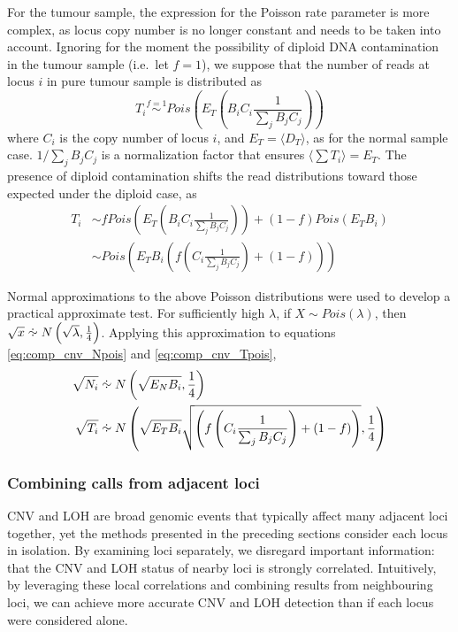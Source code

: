 \documentclass[thesis.tex]{subfiles}
\begin{document}
For the tumour sample, the expression for the Poisson rate parameter is more complex, as locus copy number is no longer constant and needs to be taken into account.  Ignoring for the moment the possibility of diploid DNA contamination in the tumour sample (i.e.\ let $f = 1$), we suppose that the number of reads at locus $i$ in pure tumour sample is distributed as
\begin{equation}
  T_i \overset{f = 1}{\sim} Pois\left(E_T \left( B_i C_i \frac{1}{\sum_{j} B_j C_j} \right) \right)
\end{equation}
where $C_i$ is the copy number of locus $i$, and $E_T = \langle D_T \rangle$, as for the normal sample case.  $1/\sum_{j} B_j C_j$ is a normalization factor that ensures $\langle \sum T_i \rangle = E_T$.  The presence of diploid contamination shifts the read distributions toward those expected under the diploid case, as
\begin{align}
  T_i &\sim f Pois\left(E_T \left( B_i C_i \frac{1}{\sum_{j} B_j C_j} \right) \right) + (1-f) Pois\left(E_T B_i\right) \\
      &\sim Pois\left(E_T B_i \left( f \left( C_i \frac{1}{\sum_{j} B_j C_j} \right) + \left(1-f\right) \right) \right) \label{eq:comp_cnv_Tpois}
\end{align}

Normal approximations to the above Poisson distributions were used to develop a practical approximate test.  For sufficiently high $\lambda$, if $X \sim Pois\left(\lambda\right)$, then $\sqrt{x} \approxdist N\left(\sqrt{\lambda}, \frac{1}{4}\right)$.  Applying this approximation to equations \ref{eq:comp_cnv_Npois} and \ref{eq:comp_cnv_Tpois},
\begin{align}
  \sqrt{N_i} &\approxdist N\left(\sqrt{E_N B_i}, \frac{1}{4}\right) \\
  \sqrt{T_i} &\approxdist N\left(\sqrt{E_T B_i} \sqrt{\left( f \left( C_i \frac{1}{\sum_{j} B_j C_j} \right) + \left(1-f\right) \right) }, \frac{1}{4}\right)
\end{align}


\subsubsection{Combining calls from adjacent loci}

\Gls{CNV} and \gls{LOH} are broad genomic events that typically affect many adjacent loci together, yet the methods presented in the preceding sections consider each locus in isolation.  By examining loci separately, we disregard important information: that the \gls{CNV} and \gls{LOH} status of nearby loci is strongly correlated.  Intuitively, by leveraging these local correlations and combining results from neighbouring loci, we can achieve more accurate \gls{CNV} and \gls{LOH} detection than if each locus were considered alone.
\end{document}
